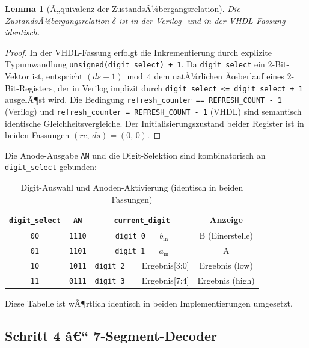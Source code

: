 ﻿\documentclass[12pt,a4paper]{report}
\newtheorem{lemma}[theorem]{Lemma}
\begin{document}
\begin{lemma}[Ã„quivalenz der ZustandsÃ¼bergangsrelation]
	\label{lem:delta_equiv}
	Die ZustandsÃ¼bergangsrelation $\delta$ ist in der Verilog- und in der
	VHDL-Fassung identisch.
\end{lemma}

\begin{proof}
	In der VHDL-Fassung erfolgt die Inkrementierung durch explizite Typumwandlung
	\texttt{unsigned(digit\_select) + 1}.  Da \texttt{digit\_select} ein
	2-Bit-Vektor ist, entspricht $(\mathit{ds} + 1) \bmod 4$ dem natÃ¼rlichen
	Ãœberlauf eines 2-Bit-Registers, der in Verilog implizit durch
	\texttt{digit\_select <= digit\_select + 1} ausgelÃ¶st wird.  Die Bedingung
	\texttt{refresh\_counter == REFRESH\_COUNT - 1} (Verilog) und
	\texttt{refresh\_counter = REFRESH\_COUNT - 1} (VHDL) sind semantisch
	identische Gleichheitsvergleiche.  Der Initialisierungszustand beider Register
	ist in beiden Fassungen $(\mathit{rc},\,\mathit{ds}) = (0,\,0)$.
\end{proof}

Die Anode-Ausgabe \texttt{AN} und die Digit-Selektion sind kombinatorisch an
\texttt{digit\_select} gebunden:

\begin{table}[H]
	\centering
	\begin{tabular}{|c|c|c|c|}
		\hline
		\textbf{\texttt{digit\_select}} & \textbf{\texttt{AN}} & \textbf{\texttt{current\_digit}} & \textbf{Anzeige} \\
		\hline
		\texttt{00} & \texttt{1110} & \texttt{digit\_0} $= b_\mathrm{in}$  & B (Einerstelle) \\
		\texttt{01} & \texttt{1101} & \texttt{digit\_1} $= a_\mathrm{in}$  & A \\
		\texttt{10} & \texttt{1011} & \texttt{digit\_2} $=$ Ergebnis[3:0]  & Ergebnis (low) \\
		\texttt{11} & \texttt{0111} & \texttt{digit\_3} $=$ Ergebnis[7:4]  & Ergebnis (high) \\
		\hline
	\end{tabular}
	\caption{Digit-Auswahl und Anoden-Aktivierung (identisch in beiden Fassungen)}
\end{table}

Diese Tabelle ist wÃ¶rtlich identisch in beiden Implementierungen umgesetzt.

\subsection{Schritt 4 â€“ 7-Segment-Decoder}
\label{sssec:seg_decoder}
\end{document}
